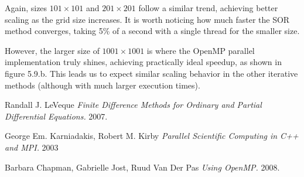 \documentclass[11pt]{report}
\begin{document}
Again, sizes $101 \times 101$ and $201 \times 201$ follow a similar trend, achieving better scaling as the grid size increases. It is worth noticing how much faster the SOR method converges, taking 5\% of a second with a single thread for the smaller size.
\newline

However, the larger size of $1001 \times 1001$ is where the OpenMP parallel implementation truly shines, achieving practically ideal speedup, as shown in figure 5.9.b. This leads us to expect similar scaling behavior in the other iterative methods (although with much larger execution times).
\newline




\begin{thebibliography}{1}

   Randall J. LeVeque {\em Finite Difference Methods for Ordinary and Partial Differential Equations.}  2007.

   George Em. Karniadakis, Robert M. Kirby {\em Parallel Scientific Computing in C++ and MPI.} 2003 

   Barbara Chapman, Gabrielle Jost, Ruud Van Der Pas {\em Using OpenMP.} 2008.

  \end{thebibliography}
\end{document}
